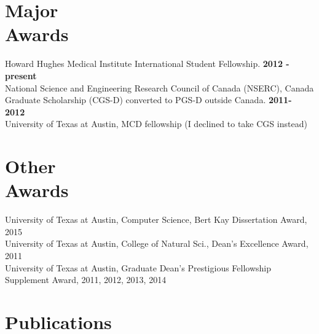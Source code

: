 \documentclass[margin,line,letterpaper]{resume}
\begin{document}
\begin{resume}
    \section{\mysidestyle Major \\Awards}
     Howard Hughes Medical Institute International Student Fellowship. \textbf{ 2012 - present}\vspace{2mm}
     \\ National Science and Engineering Research Council of Canada (NSERC), 
     Canada Graduate Scholarship (CGS-D) converted to PGS-D outside Canada. \hfill \textbf{2011- 2012} \vspace{2mm}
     \\ University of Texas at Austin, MCD fellowship (I declined to take CGS instead) 
     
     \section {\mysidestyle Other \\Awards}
     University of Texas at Austin, Computer Science, Bert Kay Dissertation Award, 2015\vspace{2mm}\\
     University of Texas at Austin, College of Natural Sci., Dean's Excellence Award, 2011\vspace{2mm}\\
     University of Texas at Austin, Graduate Dean's Prestigious Fellowship Supplement Award, 2011, 2012, 2013, 2014 \vspace{2mm}\\ 
    
    \renewcommand*{\thefootnote}{\fnsymbol{footnote}}
    \section{\mysidestyle Publications}


\end{resume}
\end{document}
